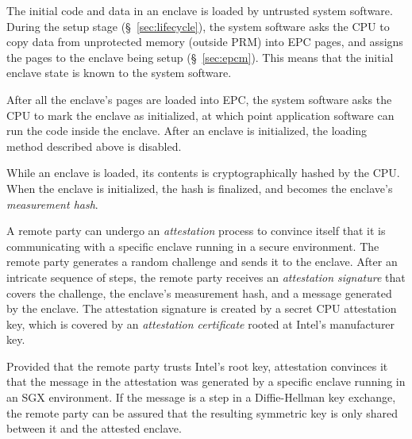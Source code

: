 The initial code and data in an enclave is loaded by untrusted system software.
During the setup stage (\S~\ref{sec:lifecycle}), the system software asks the
CPU to copy data from unprotected memory (outside PRM) into EPC pages, and
assigns the pages to the enclave being setup (\S~\ref{sec:epcm}). This
means that the initial enclave state is known to the system software.

After all the enclave's pages are loaded into EPC, the system software asks the
CPU to mark the enclave as initialized, at which point application software can
run the code inside the enclave. After an enclave is initialized, the loading
method described above is disabled.

While an enclave is loaded, its contents is cryptographically hashed by the
CPU. When the enclave is initialized, the hash is finalized, and becomes the
enclave's \textit{measurement hash}.

A remote party can undergo an \textit{attestation} process to convince itself
that it is communicating with a specific enclave running in a secure
environment. The remote party generates a random challenge and sends it to the
enclave. After an intricate sequence of steps, the remote party receives an
\textit{attestation signature} that covers the challenge, the enclave's
measurement hash, and a message generated by the enclave. The attestation
signature is created by a secret CPU attestation key, which is covered by an
\textit{attestation certificate} rooted at Intel's manufacturer key.

Provided that the remote party trusts Intel's root key, attestation convinces
it that the message in the attestation was generated by a specific enclave
running in an SGX environment. If the message is a step in a Diffie-Hellman key
exchange, the remote party can be assured that the resulting symmetric key is
only shared between it and the attested enclave.
